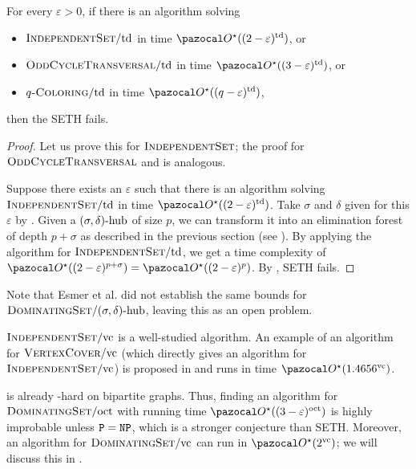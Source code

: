 \begin{corollary}
    \label{corollary:td-lowerbounds}
    For every $\varepsilon > 0$, if there is an algorithm solving
    \begin{itemize}
        \item $\textsc{IndependentSet}/\text{td}$ in time $\O^\star((2 - \varepsilon)^\td)$, or
        \item $\textsc{OddCycleTransversal}/\text{td}$ in time $\O^\star((3 - \varepsilon)^\td)$, or
        \item $q\textsc{-Coloring}/\text{td}$ in time $\O^\star((q - \varepsilon)^\td)$,
    \end{itemize}
    then the SETH fails.
\end{corollary}

\begin{proof}
    Let us prove this for $\textsc{IndependentSet}$; the proof for $\textsc{OddCycleTransversal}$ and  is analogous.

    Suppose there exists an $\varepsilon$ such that there is an algorithm solving $\textsc{IndependentSet}/\text{td}$ in time $\O^\star((2 - \varepsilon)^\td)$. Take $\sigma$ and $\delta$ given for this $\varepsilon$ by . Given a $(\sigma, \delta)\text{-hub}$ of size $p$, we can transform it into an elimination forest of depth $p + \sigma$ as described in the previous section (see ). By applying the algorithm for $\textsc{IndependentSet}/\text{td}$, we get a time complexity of $\O^\star((2 - \varepsilon)^{p + \sigma}) = \O^\star((2 - \varepsilon)^p)$. By , SETH fails.
\end{proof}

Note that Esmer et al. did not establish the same bounds for $\textsc{DominatingSet}/(\sigma, \delta)\text{-hub}$, leaving this as an open problem.

\medskip

$\textsc{IndependentSet}/\text{vc}$ is a well-studied algorithm. An example of an algorithm for $\textsc{VertexCover}/\text{vc}$ (which directly gives an algorithm for $\textsc{IndependentSet}/\text{vc}$) is proposed in \cite[Theorem 3.2]{cygan2015parameterized} and runs in time $\O^\star(1.4656^\vc)$.

\medskip

 is already \NP-hard on bipartite graphs. Thus, finding an algorithm for $\textsc{DominatingSet}/\text{oct}$  with running time $\O^\star((3-\varepsilon)^\oct)$ is highly improbable unless $\texttt{P} = \texttt{NP}$, which is a stronger conjecture than SETH. Moreover, an algorithm for $\textsc{DominatingSet}/\text{vc}$ can run in $\O^\star(2^\vc)$; we will discuss this in .

